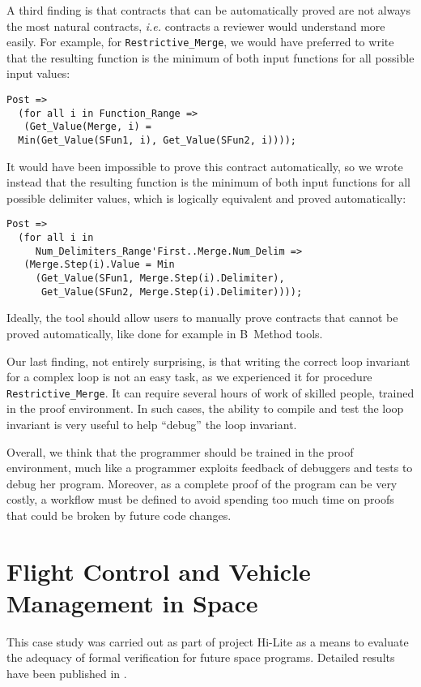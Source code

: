 \documentclass[10pt,a4paper,twocolumn]{article}
\newcommand{\hilite}{Hi-Lite\xspace}
\newcommand{\ie}{\textit{i.e.}\xspace}
\begin{document}
A third finding is that contracts that can be automatically proved are
not always the most natural contracts, \ie contracts a reviewer would
understand more easily. For example, for \verb|Restrictive_Merge|, we
would have preferred to write that the resulting function is the
minimum of both input functions for all possible input values:
\begin{lstlisting}
Post =>
  (for all i in Function_Range =>
   (Get_Value(Merge, i) =
  Min(Get_Value(SFun1, i), Get_Value(SFun2, i))));
\end{lstlisting}
It would have been impossible to prove this contract automatically, so
we wrote instead that the resulting function is the minimum of both
input functions for all possible delimiter values, which is logically
equivalent and proved automatically:
\begin{lstlisting}
Post =>
  (for all i in
     Num_Delimiters_Range'First..Merge.Num_Delim =>
   (Merge.Step(i).Value = Min
     (Get_Value(SFun1, Merge.Step(i).Delimiter),
      Get_Value(SFun2, Merge.Step(i).Delimiter))));
\end{lstlisting}
Ideally, the tool should allow users to manually prove contracts that
cannot be proved automatically, like done for example in B~Method
tools.

Our last finding, not entirely surprising, is that writing the correct
loop invariant for a complex loop is not an easy task, as we
experienced it for procedure \verb|Restrictive_Merge|. It can require
several hours of work of skilled people, trained in the proof
environment. In such cases, the ability to compile and test the loop
invariant is very useful to help ``debug'' the loop invariant.

Overall, we think that the programmer should be trained in the proof
environment, much like a programmer exploits feedback of debuggers and
tests to debug her program. Moreover, as a complete proof of the
program can be very costly, a workflow must be defined to
avoid spending too much time on proofs that could be broken by future
code changes.

\section{Flight Control and Vehicle Management in Space}
\label{sec:space}

This case study was carried out as part of project \hilite as a means
to evaluate the adequacy of formal verification for future space
programs. Detailed results have been published in
\cite{lesens:2013:dasia}.
\end{document}
